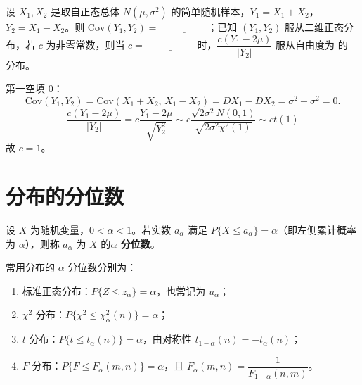 \documentclass[lang=cn,11pt]{elegantbook}
\begin{document}
\begin{exercise}\label{exer:6-cov-t}
设 \(X_1, X_2\) 是取自正态总体 \(N(\mu, \sigma^2)\) 的简单随机样本，\(Y_1=X_1+X_2\)，\(Y_2=X_1-X_2\)。则 \(\mathrm{Cov}(Y_1, Y_2) =\,\underline{\hspace{2cm}}\)；已知 \((Y_1, Y_2)\) 服从二维正态分布，若 \(c\) 为非零常数，则当 \(c =\,\underline{\hspace{2cm}}\) 时，\(\dfrac{c(Y_1-2\mu)}{|Y_2|}\) 服从自由度为\,\underline{\hspace{2cm}}\,的\,\underline{\hspace{2cm}}\,分布。
\end{exercise}
\begin{solution}
第一空填 \(0\)：
\[
\mathrm{Cov}(Y_1, Y_2) = \mathrm{Cov}(X_1+X_2,\, X_1-X_2) = DX_1 - DX_2 = \sigma^2 - \sigma^2 = 0.
\]
\[\dfrac{c(Y_1-2\mu)}{|Y_2|}=c\frac{Y_1-2\mu}{\sqrt{Y_2^2}}\sim c\frac{\sqrt{2\sigma^2}N(0,1)}{\sqrt{2\sigma^2\chi^2(1)}}\sim ct(1)\]
故 \(c = 1\)。
\end{solution}

\section{分布的分位数}

\begin{definition} \label{def:quantile}
设 \(X\) 为随机变量，\(0 < \alpha < 1\)。若实数 \(a_\alpha\) 满足 \(P\{X \le a_\alpha\} = \alpha\)（即左侧累计概率为 \(\alpha\)），则称 \(a_\alpha\) 为 \(X\) 的\textbf{\(\alpha\) 分位数}。
\end{definition}

常用分布的 \(\alpha\) 分位数分别为：
\begin{enumerate}
    \item 标准正态分布：\(P\{Z\le z_\alpha\}=\alpha\)，也常记为 \(u_\alpha\)；
    \item \(\chi^2\) 分布：\(P\{\chi^2 \le \chi_\alpha^2(n)\} = \alpha\)；
    \item \(t\) 分布：\(P\{t \le t_\alpha(n)\} = \alpha\)，由对称性 \(t_{1-\alpha}(n) = -t_\alpha(n)\)；
    \item \(F\) 分布：\(P\{F \le F_\alpha(m,n)\} = \alpha\)，且 \(F_\alpha(m,n) = \dfrac{1}{F_{1-\alpha}(n,m)}\)。
\end{enumerate}
\end{document}
